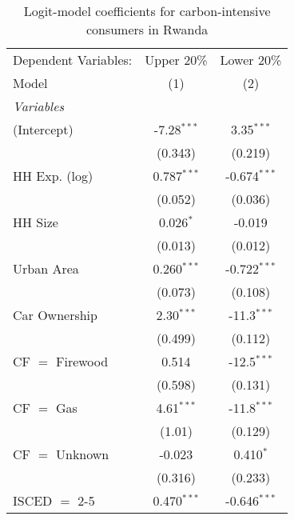 
\begin{table}[htbp!]
   \centering
   \small
   \begin{adjustbox}{width = 1\textwidth, max height = 0.95\textheight, center}
      \begin{threeparttable}[b]
         \caption{\label{tab:Logit_1_RWA} Logit-model coefficients for carbon-intensive consumers in Rwanda}
         \begin{tabular}{lcc}
            \tabularnewline \midrule \midrule
            Dependent Variables: & Upper 20\%    & Lower 20\%\\   
            Model                & (1)           & (2)\\  
            \midrule
            \emph{Variables}\\
            (Intercept)          & -7.28$^{***}$ & 3.35$^{***}$\\   
                                 & (0.343)       & (0.219)\\   
            HH Exp. (log)        & 0.787$^{***}$ & -0.674$^{***}$\\   
                                 & (0.052)       & (0.036)\\   
            HH Size              & 0.026$^{*}$   & -0.019\\   
                                 & (0.013)       & (0.012)\\   
            Urban Area           & 0.260$^{***}$ & -0.722$^{***}$\\   
                                 & (0.073)       & (0.108)\\   
            Car Ownership        & 2.30$^{***}$  & -11.3$^{***}$\\   
                                 & (0.499)       & (0.112)\\   
            CF $=$ Firewood      & 0.514         & -12.5$^{***}$\\   
                                 & (0.598)       & (0.131)\\   
            CF $=$ Gas           & 4.61$^{***}$  & -11.8$^{***}$\\   
                                 & (1.01)        & (0.129)\\   
            CF $=$ Unknown       & -0.023        & 0.410$^{*}$\\   
                                 & (0.316)       & (0.233)\\   
            ISCED $=$ 2-5        & 0.470$^{***}$ & -0.646$^{***}$\\   

\end{tabular}
\end{threeparttable}
\end{adjustbox}
\end{table}
